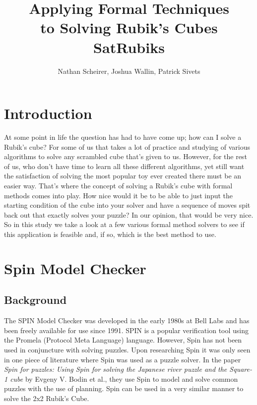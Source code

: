 \documentclass{article}
\begin{document}
\title{Applying Formal Techniques\\ to Solving Rubik's Cubes\\[3cm] SatRubiks }

\author{Nathan Scheirer, Joshua Wallin, Patrick Sivets}

\maketitle
\newpage

\section{Introduction}
At some point in life the question has had to have come up; how can I solve a Rubik's cube? For some of us that takes a lot of practice and studying of various algorithms to solve any scrambled cube that's given to us. However, for the rest of us, who don't have time to learn all these different algorithms, yet still want the satisfaction of solving the most popular toy ever created there must be an easier way. That's where the concept of solving a Rubik's cube with formal methods comes into play. How nice would it be to be able to just input the starting condition of the cube into your solver and have a sequence of moves spit back out that exactly solves your puzzle? In our opinion, that would be very nice. So in this study we take a look at a few various formal method solvers to see if this application is feasible and, if so, which is the best method to use. 

\section{Spin Model Checker}
\subsection{Background}
The SPIN Model Checker was developed in the early 1980s at Bell Labs and has been freely available for use since 1991. SPIN is a popular verification tool using the Promela (Protocol Meta Language) language. However, Spin has not been used in conjuncture with solving puzzles. Upon researching Spin it was only seen in one piece of literature where Spin was used as a puzzle solver. In the paper \textit{Spin for puzzles: Using Spin for solving the Japanese river puzzle and the Square-1 cube} by Evgeny V. Bodin et al., they use Spin to model and solve common puzzles with the use of planning. Spin can be used in a very similar manner to solve the 2x2 Rubik's Cube.
\end{document}
